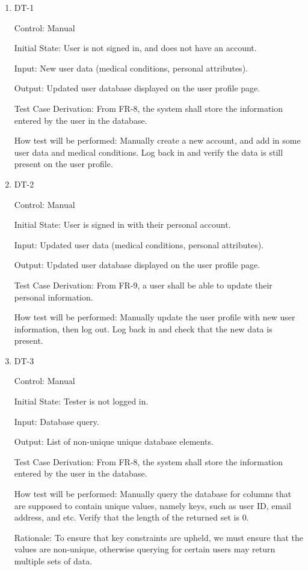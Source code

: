 \documentclass[12pt, titlepage]{article}
\begin{document}
\begin{enumerate}

\item{DT-1\\}

Control: Manual
					
Initial State: User is not signed in, and does not have an account.
					
Input: New user data (medical conditions, personal attributes).
					
Output: Updated user database displayed on the user profile page.
	
Test Case Derivation: From FR-8, the system shall store the information entered by the user in the database.

How test will be performed: Manually create a new account, and add in some user data and medical conditions. Log back in and verify the data is still present on the user profile.


\item{DT-2\\}

Control: Manual
					
Initial State: User is signed in with their personal account.
					
Input: Updated user data (medical conditions, personal attributes).
					
Output: Updated user database displayed on the user profile page.

Test Case Derivation: From FR-9, a user shall be able to update their personal information.

How test will be performed: Manually update the user profile with new user information, then log out. Log back in and check that the new data is present.


\item{DT-3\\}

Control: Manual
					
Initial State: Tester is not logged in.
					
Input: Database query.
					
Output: List of non-unique unique database elements.

Test Case Derivation: From FR-8, the system shall store the information entered by the user in the database.

How test will be performed: Manually query the database for columns that are supposed to contain unique values, namely keys, such as user ID, email address, and etc. Verify that the length of the returned set is 0.

Rationale: To ensure that key constraints are upheld, we must ensure that the values are non-unique, otherwise querying for certain users may return multiple sets of data.


\end{enumerate}
\end{document}
